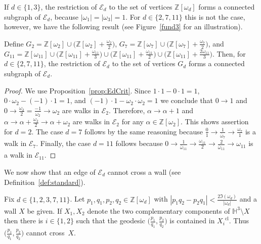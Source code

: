 \documentclass[graybox]{svmult}
\begin{document}
If $d \in\{1,3\}$, the restriction of  $\mathcal E_{d}$ to the set of vertices $\mathbb{Z}[\omega_d]$ forms a connected subgraph of 
$\mathcal E_{d}$, because $|\omega_1| = |\omega_3| = 1$. For $d \in\{ 2, 7,11\}$ this is not the case,  however, we have the following result (see Figure~\ref{fund3} for an illustration).
\begin{proposition}
Define
$G_2 = \mathbb{Z}[\omega_2] \cup \big(\mathbb{Z}[\omega_2] + \tfrac{\omega_2}{2}\big)$,
$G_7 = \mathbb{Z}[\omega_7] \cup \big(\mathbb{Z}[\omega_7] + 
\tfrac{\omega_7}{2}\big)$, and
$G_{11} = \mathbb{Z}[\omega_{11}] \cup \big(\mathbb{Z}[\omega_{11}] + 
\tfrac{\omega_{11}}{3} \big) \cup \big(\mathbb{Z}[\omega_{11}] + 
\tfrac{\omega_{11}}{2} \big) \cup \big(\mathbb{Z}[\omega_{11}] + 
\tfrac{2\omega_{11}}{3} \big)$.
Then, for $d\in\{2,7,11\}$, the restriction of  $\mathcal E_{d}$ to the set of vertices $G_d$ 
forms a connected subgraph of $\mathcal E_{d}$.
\end{proposition}

\begin{proof} We use Proposition~\ref{prop:EdCrit}.  Since 
$1\cdot1 - 0\cdot1=1$, $0\cdot \omega_2 - (-1)\cdot 1=1$, and $(-1)\cdot1 - \omega_2 \cdot \omega_2=1$ we conclude that $0\to 1$ and
$0 \to \tfrac{\omega_2}{2}=\tfrac{-1}{\omega_2} \to \omega_2$ are walks in $\mathcal E_{2}$.  Therefore, $\alpha \to \alpha+1$ and $ \alpha \to \alpha + \tfrac{\omega_2}{2} \to \alpha+\omega_2$  are walks in $\mathcal E_{2}$ for any $\alpha \in \mathbb{Z}[\omega_2]$. This shows  
assertion for $d=2$.  The case $d=7$ follows by the same reasoning because $\tfrac01\to\tfrac{1}{\overline \omega_7}\to\tfrac{\omega_7}{1}$ is a walk in $\mathcal{E}_7$.   
Finally, the case $d=11$ follows because
$0 \to \frac{1}{\overline \omega_{11}}\to\frac{\omega_{11}}{2} \to  
\frac{2}{\overline{\omega}_{11}} \to \omega_{11}$ is a walk in $\mathcal E_{11}$. 
\end{proof}

We now show that an edge of $\mathcal{E}_d$ cannot cross a wall (see Definition~\ref{def:standard}).  

\begin{theorem}\label{GeodesicIntersectW}
Fix $d\in\{1,2,3,7,11\}$. Let $p_1,q_1,p_2,q_2\in\mathbb{Z}[\omega_d]$ with $|p_1q_2-p_2q_1|< \frac{2\Im(\omega_d)}{|\omega_d|}$ and a wall $X$ be given. If $X_1,X_2$  denote the two complementary components of $\mathbb{H}^3\setminus X$ then there is $i\in\{1,2\}$ such that the geodesic $\big(\frac{p_1}{q_1}, \frac {p_2}{q_2}\big)$ is contained in ${X_i}^{\mathrm{cl}}$. Thus $\big(\frac{p_1}{q_1}, \frac {p_2}{q_2}\big)$ cannot cross~$X$. 
\end{theorem}
\end{document}
